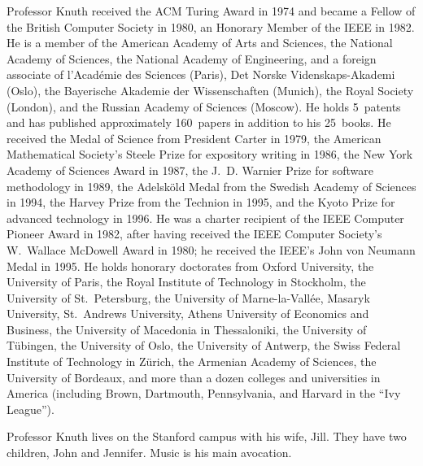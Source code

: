 Professor Knuth received the ACM Turing Award in 1974 and became a Fellow
of the British Computer Society in 1980, an Honorary
Member of the IEEE in 1982. He is a member of the American Academy of Arts and
Sciences, the National Academy of Sciences, the National Academy of
Engineering, and a foreign associate of l'Acad\'emie des Sciences (Paris),
Det Norske Videnskaps-Akademi (Oslo), the Bayerische Akademie der
Wissenschaften (Munich), the Royal Society (London), and the Russian
Academy of Sciences (Moscow).
He holds 5~patents and has published
approximately 160~papers in addition to his 25~books. He received the Medal of
Science from President Carter in 1979, the American Mathematical Society's
Steele Prize for expository writing in 1986, the New York Academy of Sciences
Award in 1987, the J.~D. Warnier Prize for software methodology in 1989,
the Adelsk\"old Medal from the Swedish Academy of Sciences in 1994, the
Harvey Prize from the Technion in 1995, and the Kyoto Prize for advanced
technology in 1996. He was
a charter recipient of the IEEE Computer Pioneer Award in 1982, after having
received the IEEE Computer Society's W.~Wallace McDowell Award in 1980; he
received the IEEE's John von Neumann Medal in 1995. He
holds honorary doctorates from Oxford University, the University of Paris,
the Royal Institute of Technology in Stockholm, 
the University of St.~Petersburg,
the University of Marne-la-Vall\'ee,
Masaryk University,
St.~Andrews University,
Athens University of Economics and Business,
the University of Macedonia in Thessaloniki,
the University of T\"ubingen,
the University of Oslo,
the University of Antwerp,
the Swiss Federal Institute of Technology in Z\"urich,
the Armenian Academy of Sciences,
the University of Bordeaux,
and more than a dozen colleges and universities in America (including
Brown, Dartmouth, Pennsylvania, and Harvard in the ``Ivy League'').

Professor Knuth lives on the Stanford campus with his wife, Jill. They have two
children, John and Jennifer. Music is his main avocation.

\bye
